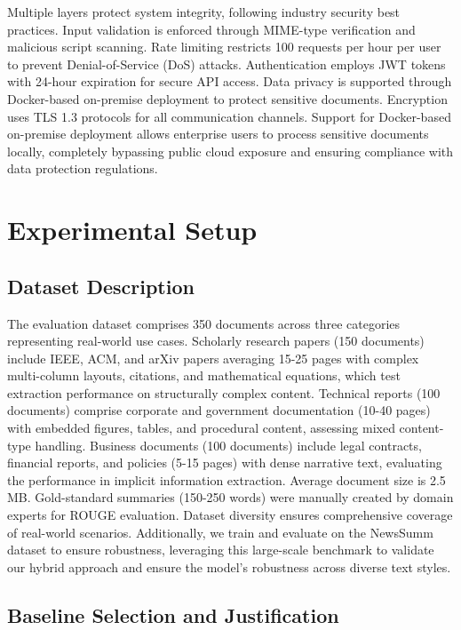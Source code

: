 \documentclass[conference]{IEEEtran}
\begin{document}
Multiple layers protect system integrity, following industry security best practices. Input validation is enforced through MIME-type verification and malicious script scanning. Rate limiting restricts 100 requests per hour per user to prevent Denial-of-Service (DoS) attacks. Authentication employs JWT tokens with 24-hour expiration for secure API access. Data privacy is supported through Docker-based on-premise deployment to protect sensitive documents. Encryption uses TLS 1.3 protocols for all communication channels. Support for Docker-based on-premise deployment allows enterprise users to process sensitive documents locally, completely bypassing public cloud exposure and ensuring compliance with data protection regulations.

\section{Experimental Setup}

\subsection{Dataset Description}

The evaluation dataset comprises 350 documents across three categories representing real-world use cases. Scholarly research papers (150 documents) include IEEE, ACM, and arXiv papers averaging 15-25 pages with complex multi-column layouts, citations, and mathematical equations, which test extraction performance on structurally complex content. Technical reports (100 documents) comprise corporate and government documentation (10-40 pages) with embedded figures, tables, and procedural content, assessing mixed content-type handling. Business documents (100 documents) include legal contracts, financial reports, and policies (5-15 pages) with dense narrative text, evaluating the performance in implicit information extraction. Average document size is 2.5 MB. Gold-standard summaries (150-250 words) were manually created by domain experts for ROUGE evaluation. Dataset diversity ensures comprehensive coverage of real-world scenarios. Additionally, we train and evaluate on the NewsSumm dataset to ensure robustness, leveraging this large-scale benchmark to validate our hybrid approach and ensure the model's robustness across diverse text styles.

\subsection{Baseline Selection and Justification}
\end{document}
